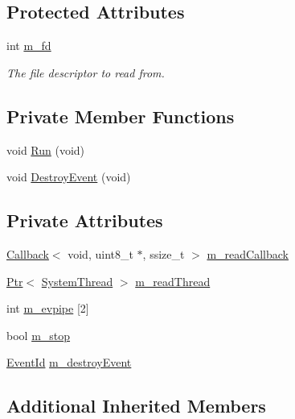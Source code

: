 \subsection*{Protected Attributes}
\begin{DoxyCompactItemize}
\item 
int \hyperlink{classns3_1_1FdReader_ad0883be1c0ebac30885c17c0cc17076d}{m\+\_\+fd}
\begin{DoxyCompactList}\small\item\em The file descriptor to read from. \end{DoxyCompactList}\end{DoxyCompactItemize}
\subsection*{Private Member Functions}
\begin{DoxyCompactItemize}
\item 
void \hyperlink{classns3_1_1FdReader_abac0b41fc484fbc47c37a14174bddb03}{Run} (void)
\item 
void \hyperlink{classns3_1_1FdReader_a7de041cbd9bfab170576ddd6fa83eea9}{Destroy\+Event} (void)
\end{DoxyCompactItemize}
\subsection*{Private Attributes}
\begin{DoxyCompactItemize}
\item 
\hyperlink{classns3_1_1Callback}{Callback}$<$ void, uint8\+\_\+t $\ast$, ssize\+\_\+t $>$ \hyperlink{classns3_1_1FdReader_af5cd7136ecc802487df40cd8046d6fe1}{m\+\_\+read\+Callback}
\item 
\hyperlink{classns3_1_1Ptr}{Ptr}$<$ \hyperlink{classns3_1_1SystemThread}{System\+Thread} $>$ \hyperlink{classns3_1_1FdReader_ae610be5a8e8c8e72620fe131f3277cd6}{m\+\_\+read\+Thread}
\item 
int \hyperlink{classns3_1_1FdReader_a0c4a678111029fdc40948d4d7657aa41}{m\+\_\+evpipe} \mbox{[}2\mbox{]}
\item 
bool \hyperlink{classns3_1_1FdReader_a53bb467852fcfe1a12dd0e32f846b01e}{m\+\_\+stop}
\item 
\hyperlink{classns3_1_1EventId}{Event\+Id} \hyperlink{classns3_1_1FdReader_a9f3cee67eb1d43aa53ebc23384e32828}{m\+\_\+destroy\+Event}
\end{DoxyCompactItemize}
\subsection*{Additional Inherited Members}


